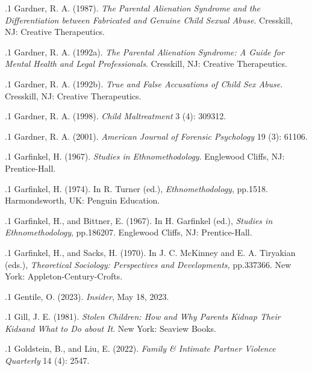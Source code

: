 \documentclass[11pt, twoside]{article}
\begin{document}
{\p.1{%
Gardner, R. A. (1987). \textit{The Parental Alienation Syndrome and the Differentiation
between Fabricated and Genuine Child Sexual Abuse}. Cresskill, NJ: Creative
Therapeutics.
}%

\p.1{%
Gardner, R. A. (1992a). \textit{The Parental Alienation Syndrome: A Guide for Mental Health
and Legal Professionals}. Cresskill, NJ: Creative Therapeutics.
}%

\p.1{%
Gardner, R. A. (1992b). \textit{True and False Accusations of Child Sex Abuse}. Cresskill, NJ:
Creative Therapeutics.
}%

\p.1{%
Gardner, R. A. (1998).  \textit{Child Maltreatment}
3 (4): 309\ndash{}312.
}%

\p.1{%
Gardner, R. A. (2001).  \textit{American Journal of Forensic Psychology}
19 (3): 61\ndash{}106.
}%

\p.1{%
Garfinkel, H. (1967). \textit{Studies in Ethnomethodology}. Englewood Cliffs, NJ:
Prentice-Hall.
}%

\p.1{%
Garfinkel, H. (1974).  In R.
Turner (ed.), \textit{Ethnomethodology}, pp.\@ 15\ndash{}18. Harmondsworth, UK: Penguin
Education.
}%

\p.1{%
Garfinkel, H., and Bittner, E. (1967).  In H. Garfinkel (ed.), \textit{Studies in Ethnomethodology}, pp.\@ 186\ndash{}207. Englewood Cliffs, NJ: Prentice-Hall.
}%

\p.1{%
Garfinkel, H., and Sacks, H. (1970).  In
J. C. McKinney and E. A. Tiryakian (eds.), \textit{Theoretical Sociology: Perspectives and
Developments,} pp.\@ 337\ndash{}366. New York: Appleton-Century-Crofts.
}%

\p.1{%
Gentile, O. (2023). 
\textit{Insider}, May 18, 2023.
}%

\p.1{%
Gill, J. E. (1981). \textit{Stolen Children: How and Why Parents Kidnap Their Kids\mdash{}and What
to Do about It}. New York: Seaview Books.
}%

\p.1{%
Goldstein, B., and Liu, E. (2022).  \textit{Family \& Intimate Partner Violence Quarterly} 14 (4):
25\ndash{}47.
}%

}
\end{document}
